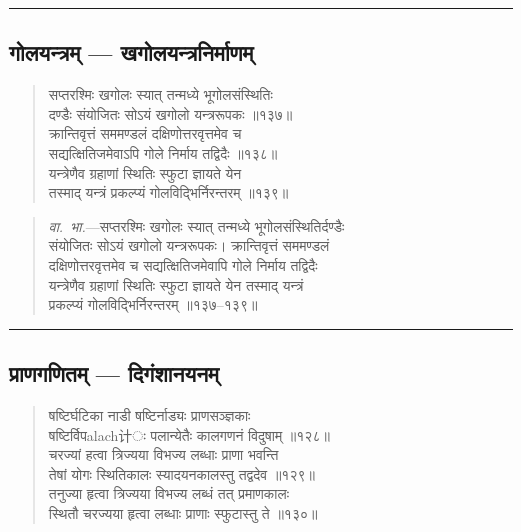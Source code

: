 \documentclass[11pt,a4paper]{article}
\newcommand{\longline}{\noindent\rule{\textwidth}{0.4pt}}
\newcommand{\dev}[1]{{\devanagarifont #1}}
\newenvironment{shloka}{%
  \begin{quote}
  \small
  \setlength{\leftmargin}{2em}
  \devanagarifont
}{\end{quote}}
\newenvironment{vyakhya}{%
  \begin{quote}
  \small
  \setlength{\leftmargin}{1em}
  \devanagarifont
}{\end{quote}}
\newcommand{\skt}[1]{{\devanagarifont #1}}
\begin{document}
\longline

\subsection{\dev{गोलयन्त्रम् — खगोलयन्त्रनिर्माणम्}}

\begin{shloka}
\skt{सप्तरश्मिः खगोलः स्यात् तन्मध्ये भूगोलसंस्थितिः}\\[0.3em]
\skt{दण्डैः संयोजितः सोऽयं खगोलो यन्त्ररूपकः ॥१३७॥}\\[0.3em]
\skt{क्रान्तिवृत्तं सममण्डलं दक्षिणोत्तरवृत्तमेव च}\\[0.3em]
\skt{सद्यत्क्षितिजमेवाऽपि गोले निर्माय तद्विदैः ॥१३८॥}\\[0.3em]
\skt{यन्त्रेणैव ग्रहाणां स्थितिः स्फुटा ज्ञायते येन}\\[0.3em]
\skt{तस्माद् यन्त्रं प्रकल्प्यं गोलविद्भिर्निरन्तरम् ॥१३९॥}
\end{shloka}

\begin{vyakhya}
\textit{वा.~भा.}—\skt{सप्तरश्मिः खगोलः स्यात् तन्मध्ये भूगोलसंस्थितिर्दण्डैः}\\
\skt{संयोजितः सोऽयं खगोलो यन्त्ररूपकः। क्रान्तिवृत्तं सममण्डलं}\\
\skt{दक्षिणोत्तरवृत्तमेव च सद्यत्क्षितिजमेवापि गोले निर्माय तद्विदैः}\\
\skt{यन्त्रेणैव ग्रहाणां स्थितिः स्फुटा ज्ञायते येन तस्माद् यन्त्रं}\\
\skt{प्रकल्प्यं गोलविद्भिर्निरन्तरम् ॥१३७--१३९॥}
\end{vyakhya}

\longline

\subsection{\dev{प्राणगणितम् — दिगंशानयनम्}}

\begin{shloka}
\skt{षष्टिर्घटिका नाडी षष्टिर्नाड्यः प्राणसञ्ज्ञकाः}\\[0.3em]
\skt{षष्टिर्विपalach计ः पलान्येतैः कालगणनं विदुषाम् ॥१२८॥}\\[0.3em]
\skt{चरज्यां हत्वा त्रिज्यया विभज्य लब्धाः प्राणा भवन्ति}\\[0.3em]
\skt{तेषां योगः स्थितिकालः स्यादयनकालस्तु तद्वदेव ॥१२९॥}\\[0.3em]
\skt{तनुज्या हृत्वा त्रिज्यया विभज्य लब्धं तत् प्रमाणकालः}\\[0.3em]
\skt{स्थितौ चरज्यया हृत्वा लब्धाः प्राणाः स्फुटास्तु ते ॥१३०॥}
\end{shloka}
\end{document}
